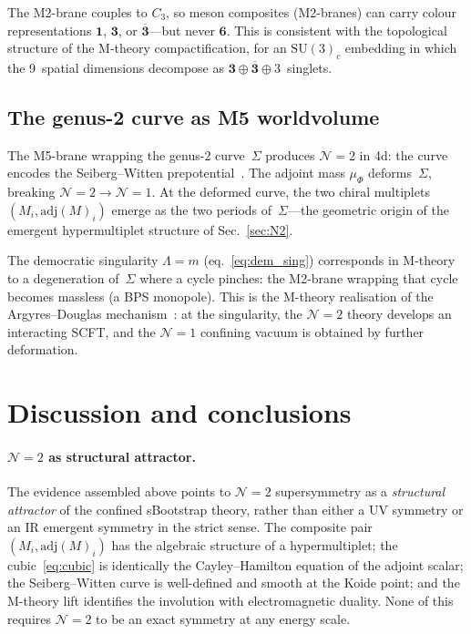 \documentclass[aps,prd,twocolumn,showpacs,preprintnumbers,superscriptaddress,floatfix]{revtex4-2}
\newcommand{\SU}{\mathrm{SU}}
\newcommand{\adj}{\mathrm{adj}}
\begin{document}
The M2-brane couples to $C_3$, so meson composites (M2-branes) can
carry colour representations $\mathbf{1}$, $\mathbf{3}$, or
$\overline{\mathbf{3}}$---but never $\mathbf{6}$.
This is consistent with the topological structure of the M-theory
compactification, for an $\SU(3)_c$ embedding in which the
9~spatial dimensions decompose as
$\mathbf{3} \oplus \overline{\mathbf{3}} \oplus 3$~singlets.


\subsection{The genus-2 curve as M5 worldvolume}

The M5-brane wrapping the genus-2 curve~$\Sigma$ produces
$\mathcal{N}{=}2$ in 4d: the curve encodes the Seiberg--Witten
prepotential~\cite{Witten:1997sc,Klemm:1996,ArgyresShapere:1995}.
The adjoint mass $\mu_\Phi$ deforms~$\Sigma$, breaking
$\mathcal{N}{=}2 \to \mathcal{N}{=}1$.
At the deformed curve, the two chiral multiplets
$(M_i, \adj(M)_i)$ emerge as the two periods of~$\Sigma$---the
geometric origin of the emergent hypermultiplet structure of
Sec.~\ref{sec:N2}.

The democratic singularity $\Lambda = m$ (eq.~\eqref{eq:dem_sing})
corresponds in M-theory to a degeneration of~$\Sigma$ where
a cycle pinches: the M2-brane wrapping that cycle becomes
massless (a BPS monopole).
This is the M-theory realisation of the
Argyres--Douglas mechanism~\cite{ArgyresDouglas:1995}: at the
singularity, the $\mathcal{N}{=}2$ theory develops an interacting
SCFT, and the $\mathcal{N}{=}1$ confining vacuum is obtained by
further deformation.


\section{Discussion and conclusions}
\label{sec:discussion}

\paragraph{$\mathcal{N}{=}2$ as structural attractor.}
The evidence assembled above points to $\mathcal{N}{=}2$
supersymmetry as a \emph{structural attractor} of the confined
sBootstrap theory, rather than either a UV symmetry or an IR
emergent symmetry in the strict sense.
The composite pair $(M_i, \adj(M)_i)$ has the algebraic structure
of a hypermultiplet; the cubic~\eqref{eq:cubic} is identically the
Cayley--Hamilton equation of the adjoint scalar; the Seiberg--Witten
curve is well-defined and smooth at the Koide point; and the
M-theory lift identifies the involution with electromagnetic
duality.
None of this requires $\mathcal{N}{=}2$ to be an exact symmetry at
any energy scale.
\end{document}
